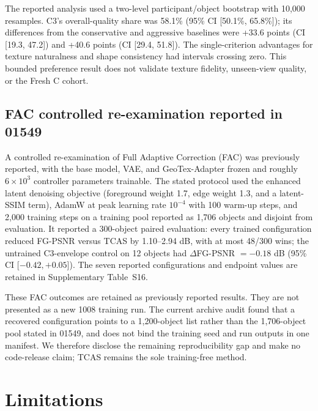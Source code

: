 \documentclass[times,twocolumn,final]{elsarticle}
\begin{document}
The reported analysis used a two-level participant/object bootstrap with 10,000 resamples. C3's overall-quality share was 58.1\% (95\% CI [50.1\%, 65.8\%]); its differences from the conservative and aggressive baselines were +33.6 points (CI [19.3, 47.2]) and +40.6 points (CI [29.4, 51.8]). The single-criterion advantages for texture naturalness and shape consistency had intervals crossing zero. This bounded preference result does not validate texture fidelity, unseen-view quality, or the Fresh C cohort.

\subsection{FAC controlled re-examination reported in 01549}
\label{subsec:facreported}

A controlled re-examination of Full Adaptive Correction (FAC) was previously reported, with the base model, VAE, and GeoTex-Adapter frozen and roughly $6\times10^3$ controller parameters trainable. The stated protocol used the enhanced latent denoising objective (foreground weight 1.7, edge weight 1.3, and a latent-SSIM term), AdamW at peak learning rate $10^{-4}$ with 100 warm-up steps, and 2,000 training steps on a training pool reported as 1,706 objects and disjoint from evaluation. It reported a 300-object paired evaluation: every trained configuration reduced FG-PSNR versus TCAS by 1.10--2.94 dB, with at most 48/300 wins; the untrained C3-envelope control on 12 objects had $\Delta$FG-PSNR $=-0.18$ dB (95\% CI [$-0.42,+0.05$]). The seven reported configurations and endpoint values are retained in Supplementary Table~S16.

These FAC outcomes are retained as previously reported results. They are not presented as a new 1008 training run. The current archive audit found that a recovered configuration points to a 1,200-object list rather than the 1,706-object pool stated in 01549, and does not bind the training seed and run outputs in one manifest. We therefore disclose the remaining reproducibility gap and make no code-release claim; TCAS remains the sole training-free method.

\FloatBarrier
\section{Limitations}
\label{sec:limitations}
\end{document}
